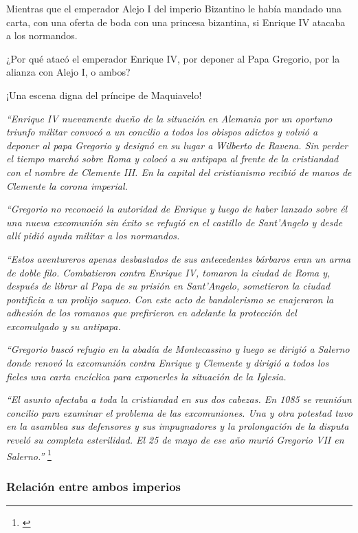 Mientras que el emperador Alejo I del imperio Bizantino le había mandado
una carta, con una oferta de boda con una princesa bizantina,
si Enrique IV atacaba a los normandos.

¿Por qué atacó el emperador Enrique IV, por deponer al Papa Gregorio,
por la alianza con Alejo I, o ambos?

¡Una escena digna del príncipe de Maquiavelo!

\textit{
	``Enrique IV nuevamente dueño de la situación en Alemania por
	un oportuno triunfo militar convocó a un concilio a todos
	los obispos adictos y volvió a deponer al papa Gregorio
	y designó en su lugar a Wilberto de Ravena. Sin perder
	el tiempo marchó sobre Roma y colocó a su antipapa al frente
	de la cristiandad con el nombre de Clemente III.
	En la capital del cristianismo recibió de manos de Clemente
	la corona imperial.
}

\textit{
	``Gregorio no reconoció la autoridad de Enrique y luego
	de haber lanzado sobre él una nueva excomunión sin éxito
	se refugió en el castillo de Sant'Angelo y desde allí
	pidió ayuda militar a los normandos.
}

\textit{
	``Estos aventureros apenas desbastados de sus antecedentes
	bárbaros eran un arma de doble filo. Combatieron contra
	Enrique IV, tomaron la ciudad de Roma y, después de librar
	al Papa de su prisión en Sant'Angelo, sometieron la ciudad
	pontificia a un prolijo saqueo. Con este acto de bandolerismo
	se enajeraron la adhesión de los romanos que prefirieron
	en adelante la protección del excomulgado y su antipapa.
}

\textit{
	``Gregorio buscó refugio en la abadía de Montecassino y luego
	se dirigió a Salerno donde renovó la excomunión contra
	Enrique y Clemente y dirigió a todos los fieles una carta
	encíclica para exponerles la situación de la Iglesia.
}

\textit{
	``El asunto afectaba a toda la cristiandad en sus dos cabezas.
	En 1085 se reunióun concilio para examinar el problema
	de las excomuniones. Una y otra potestad tuvo en la
	asamblea sus defensores y sus impugnadores y la prolongación
	de la disputa reveló su completa esterilidad. El 25 de mayo de
	ese año murió Gregorio VII en Salerno.''
}\footnote{\cite[p.~871--872]{ciudad}}

\subsubsection{Relación entre ambos imperios}

